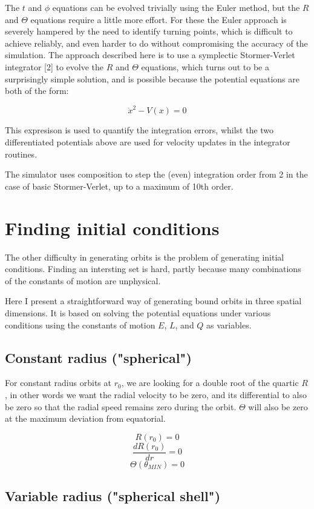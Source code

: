 \documentclass[11pt]{article}
\begin{document}
The $t$ and $\phi$ equations can be evolved trivially using the Euler method, but the $R$ and $\Theta$ equations require a little more effort.  For these the Euler approach is severely hampered by the need to identify turning points, which is difficult to achieve reliably, and even harder to do without compromising the accuracy of the simulation.  The approach described here is to use a symplectic Stormer-Verlet integrator [2] to evolve the $R$ and $\Theta$ equations, which turns out to be a surprisingly simple solution, and is possible because the potential equations are both of the form:

$$
\dot x^2 - V(x) = 0
$$

This expresison is used to quantify the integration errors, whilst the two differentiated potentials above are used for velocity updates in the integrator routines.

The simulator uses composition to step the (even) integration order from 2 in the case of basic Stormer-Verlet, up to a maximum of 10th order.

\section{Finding initial conditions}

The other difficulty in generating orbits is the problem of generating initial conditions.  Finding an intersting set is hard, partly because many combinations of the constants of motion are unphysical.

Here I present a straightforward way of generating bound orbits in three spatial dimensions.  It is based on solving the potential equations under various conditions using the constants of motion $E$, $L$, and $Q$ as variables.

\subsection{Constant radius ("spherical")}

For constant radius orbits at $r_0$, we are looking for a double root of the quartic $R$, in other words we want the radial velocity to be zero, and its differential to also be zero so that the radial speed remains zero during the orbit.  $\Theta$ will also be zero at the maximum deviation from equatorial. 

$$
R(r_0) = 0
$$
$$
\frac{d R(r_0)}{d r} = 0
$$
$$
\Theta(\theta_{MIN}) = 0
$$

\subsection{Variable radius ("spherical shell")}
\end{document}
